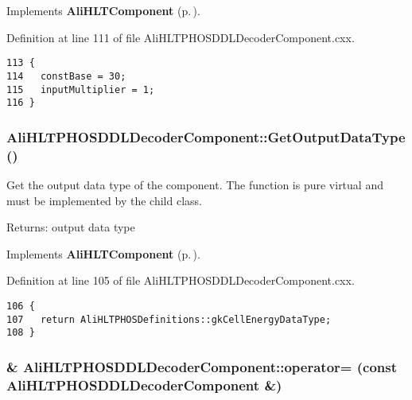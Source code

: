 Implements {\bf Ali\-HLTComponent} {\rm (p.\,\pageref{classAliHLTComponent_a12})}.

Definition at line 111 of file Ali\-HLTPHOSDDLDecoder\-Component.cxx.

\footnotesize\begin{verbatim}113 {
114   constBase = 30;
115   inputMultiplier = 1;
116 }
\end{verbatim}\normalsize 


\subsubsection{ Ali\-HLTPHOSDDLDecoder\-Component::Get\-Output\-Data\-Type ()\hspace{0.3cm}{\tt  [virtual]}}\label{classAliHLTPHOSDDLDecoderComponent_a12}


Get the output data type of the component. The function is pure virtual and must be implemented by the child class. \begin{Desc}
\item[Returns:]output data type \end{Desc}


Implements {\bf Ali\-HLTComponent} {\rm (p.\,\pageref{classAliHLTComponent_a11})}.

Definition at line 105 of file Ali\-HLTPHOSDDLDecoder\-Component.cxx.

\footnotesize\begin{verbatim}106 {
107   return AliHLTPHOSDefinitions::gkCellEnergyDataType;
108 }
\end{verbatim}\normalsize 


\subsubsection{\& Ali\-HLTPHOSDDLDecoder\-Component::operator= (const {\bf Ali\-HLTPHOSDDLDecoder\-Component} \&)\hspace{0.3cm}{\tt  [inline]}}\label{classAliHLTPHOSDDLDecoderComponent_a3}




